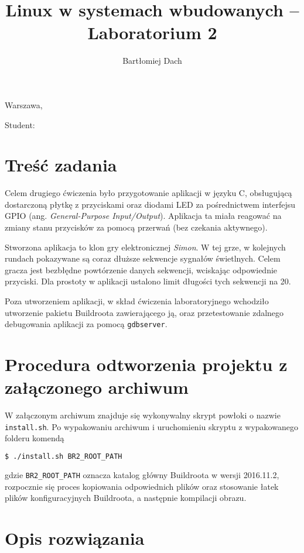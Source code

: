 \documentclass[10pt,a4paper]{article}
\title{Linux w systemach wbudowanych -- Laboratorium 2}
\author{Bartłomiej Dach}
\begin{document}
\makeatletter
\begin{flushright}
	Warszawa, \@date
\end{flushright}
\begin{center}
	\LARGE{\@title}
\end{center}
\vspace{0.25cm}
Student: \@author
\makeatother

\section{Treść zadania}

Celem drugiego ćwiczenia było przygotowanie aplikacji w języku C, obsługującą dostarczoną płytkę z przyciskami oraz diodami LED za pośrednictwem interfejsu GPIO (ang. \emph{General-Purpose Input/Output}). Aplikacja ta miała reagować na zmiany stanu przycisków za pomocą przerwań (bez czekania aktywnego).

Stworzona aplikacja to klon gry elektronicznej \emph{Simon}. W tej grze, w kolejnych rundach pokazywane są coraz dłuższe sekwencje sygnałów świetlnych. Celem gracza jest bezbłędne powtórzenie danych sekwencji, wciskając odpowiednie przyciski. Dla prostoty w aplikacji ustalono limit długości tych sekwencji na 20.

Poza utworzeniem aplikacji, w skład ćwiczenia laboratoryjnego wchodziło utworzenie pakietu Buildroota zawierającego ją, oraz przetestowanie zdalnego debugowania aplikacji za pomocą \verb+gdbserver+.

\section{Procedura odtworzenia projektu z załączonego archiwum}

W załączonym archiwum znajduje się wykonywalny skrypt powłoki o nazwie \verb+install.sh+. Po wypakowaniu archiwum i uruchomieniu skryptu z wypakowanego folderu komendą
\begin{lstlisting}[language=bash]
$ ./install.sh BR2_ROOT_PATH
\end{lstlisting}
gdzie \verb+BR2_ROOT_PATH+ oznacza katalog główny Buildroota w wersji 2016.11.2, rozpocznie się proces kopiowania odpowiednich plików oraz stosowanie łatek plików konfiguracyjnych Buildroota, a następnie kompilacji obrazu.

\section{Opis rozwiązania}
\end{document}
